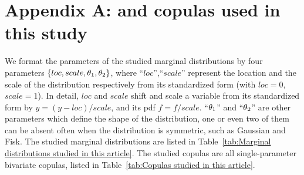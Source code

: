\newpage

\renewcommand\thefigure{A\arabic{figure}}    
\setcounter{figure}{0}  
\renewcommand\thetable{A\arabic{table}}    
\setcounter{table}{0}  

\section*{Appendix A:  and copulas used in this study}
\label{sec:Margins and copulas used in this study}

We format the parameters of the studied marginal distributions by four parameters $\left\{loc, scale, \blueC{\theta_1}, \blueC{\theta_2} \right\}$, where ``$loc$'',``$scale$'' represent the location and the scale of the distribution respectively from its standardized form (with $loc=0$, $scale=1$). In detail, $loc$ and $scale$ shift and scale a variable from its standardized form by $y = (y-loc)/scale$, and its pdf $f = f/scale$. ``$\blueC{\theta_1}$'' and ``$\blueC{\theta_2}$'' are other parameters which define the shape of the distribution, one or even two of them can be absent often when the distribution is symmetric, such as Gaussian and Fisk. The studied marginal distributions are listed in Table~\ref{tab:Marginal distributions studied in this article}. The studied copulas are all single-parameter bivariate copulas, listed in Table~\ref{tab:Copulas studied in this article}. 

